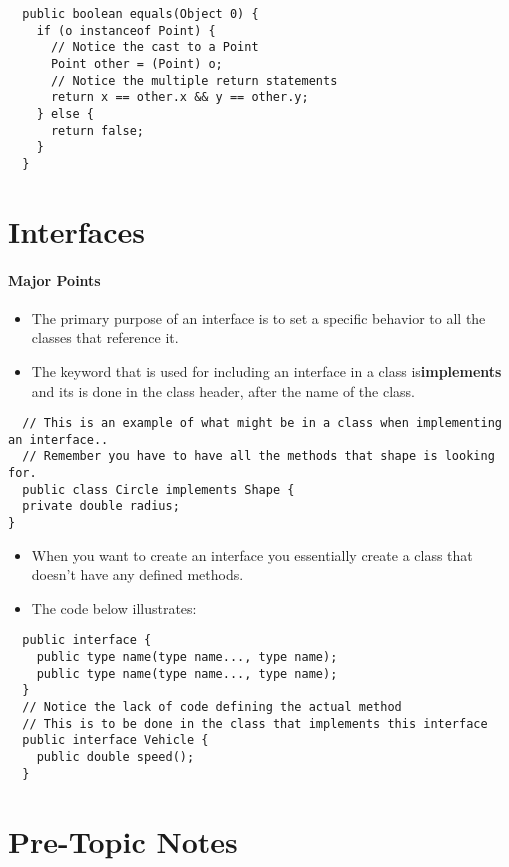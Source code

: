 \documentclass{article}
\begin{document}
\begin{lstlisting}
  public boolean equals(Object 0) {
    if (o instanceof Point) {
      // Notice the cast to a Point
      Point other = (Point) o;
      // Notice the multiple return statements
      return x == other.x && y == other.y;
    } else {
      return false;
    }
  }
\end{lstlisting}
\pagebreak
\section{Interfaces}
\paragraph{Major Points}

\begin{itemize}
  \item The primary purpose of an interface is to set a specific behavior to
  all the classes that reference it. 
  \item The keyword that is used for including an interface in a class
  is\textbf{implements} and its is done in the class header, after the name of
  the class.
\end{itemize}

\begin{lstlisting}
  // This is an example of what might be in a class when implementing an interface..
  // Remember you have to have all the methods that shape is looking for.
  public class Circle implements Shape {
  private double radius;
}
\end{lstlisting}

\begin{itemize}
  \item When you want to create an interface you essentially create a class that
  doesn't have any defined methods.
  \item The code below illustrates:
\end{itemize}

\begin{lstlisting}
  public interface { 
    public type name(type name..., type name);
    public type name(type name..., type name);
  }
  // Notice the lack of code defining the actual method
  // This is to be done in the class that implements this interface
  public interface Vehicle {
    public double speed();
  }
\end{lstlisting}

\section{Pre-Topic Notes}
\end{document}
